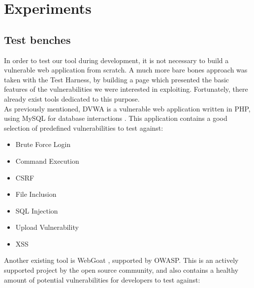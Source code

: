 \section{Experiments}


\subsection{Test benches}
In order to test our tool during development, it is not necessary to build a vulnerable web application from scratch. A much more bare bones approach was taken with the Test Harness, by building a page which presented the basic features of the vulnerabilities we were interested in exploiting. 
  Fortunately, there already exist tools dedicated to this purpose. \\

As previously mentioned, DVWA is a vulnerable web application written in PHP, using MySQL for database interactions \cite{dvwaSite}. This application contains a good selection of predefined vulnerabilities to test against:
\begin{multicols}{3}
	\begin{itemize}
		\item Brute Force Login
		\item Command Execution
		\item CSRF
		\item File Inclusion
		\item SQL Injection
		\item Upload Vulnerability
		\item XSS	
	\end{itemize}
\end{multicols}

Another existing tool is WebGoat \cite{webgoatIntro, webgoatGithub}, supported by OWASP. This is an actively supported project by the open source community, and also contains a healthy amount of potential vulnerabilities for developers to test against:

